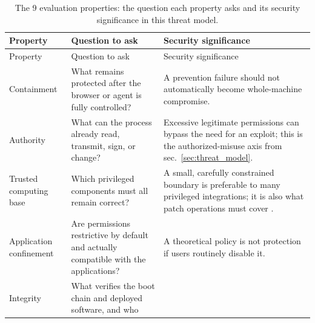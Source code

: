 \documentclass[
  english,
  9pt,
]{extarticle}
\begin{document}
\begin{longtable}[]{@{}
  >{\raggedright\arraybackslash}p{}
  >{\raggedright\arraybackslash}p{}
  >{\raggedright\arraybackslash}p{}@{}}
\caption{The 9 evaluation properties: the question each property asks
and its security significance in this threat
model.}\label{tbl:properties}\tabularnewline
\toprule\noalign{}
\begin{minipage}[b]{\linewidth}\raggedright
Property
\end{minipage} & \begin{minipage}[b]{\linewidth}\raggedright
Question to ask
\end{minipage} & \begin{minipage}[b]{\linewidth}\raggedright
Security significance
\end{minipage} \\
\midrule\noalign{}
\endfirsthead
\toprule\noalign{}
\begin{minipage}[b]{\linewidth}\raggedright
Property
\end{minipage} & \begin{minipage}[b]{\linewidth}\raggedright
Question to ask
\end{minipage} & \begin{minipage}[b]{\linewidth}\raggedright
Security significance
\end{minipage} \\
\midrule\noalign{}
\endhead
\bottomrule\noalign{}
\endlastfoot
Containment & What remains protected after the browser or agent is fully
controlled? & A prevention failure should not automatically become
whole-machine compromise. \\
Authority & What can the process already read, transmit, sign, or
change? & Excessive legitimate permissions can bypass the need for an
exploit; this is the authorized-misuse axis from
sec.~\ref{sec:threat_model}. \\
Trusted computing base & Which privileged components must all remain
correct? & A small, carefully constrained boundary is preferable to many
privileged integrations; it is also what patch operations must cover
\citep{saltzer1975}. \\
Application confinement & Are permissions restrictive by default and
actually compatible with the applications? & A theoretical policy is not
protection if users routinely disable it. \\
Integrity & What verifies the boot chain and deployed software, and who

\end{longtable}
\end{document}
